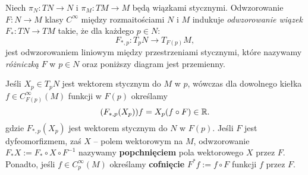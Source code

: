 Niech \(\pi_N: TN \to N\) i \(\pi_M: TM \to M\) będą wiązkami stycznymi. Odwzorowanie \(F:N\to M\) klasy \(C^\infty\) między rozmaitościami \(N\) i \(M\) indukuje \emph{odwzorowanie wiązek} \(F_\ast: TN\to TM\) takie, że dla każdego \(p\in N\):  
\begin{equation*}
F_{\ast, p}:T_p N\rightarrow T_{F(p)}M, 
\end{equation*}
jest odwzorowaniem liniowym między przestrzeniami stycznymi, które nazywamy \emph{różniczką} \(F\) w \(p\in N\) oraz poniższy diagram jest przemienny. 
\begin{figure}[!h]
\centering
{}
\end{figure}

Jeśli \(X_p\in T_p N\) jest wektorem stycznym do \(M\) w \(p\), wówczas dla dowolnego kiełka \(f\in C_{F(p)}^\infty(M)\) funkcji w \(F(p)\) określamy 
\begin{equation*}
(F_{\ast, p} (X_p))f = X_p(f\circ F) \in \mathbb{R}.
\end{equation*} 
gdzie \(F_{\ast, p} (X_p)\) jest wektorem stycznym do \(N\) w \(F(p)\). Jeśli \(F\) jest dyfeomorfizmem, zaś \(X\) -- polem wektorowym na \(M\), odwzorowanie \(F_\ast X := F_\ast \circ X \circ F^{-1}\) nazywamy \textbf{popchnięciem} pola wektorowego \(X\) przez \(F\). Ponadto, jeśli \(f\in C_p^\infty(M)\) określamy \textbf{cofnięcie} \(F^\ast f := f\circ F\) funkcji \(f\) przez \(F\).


